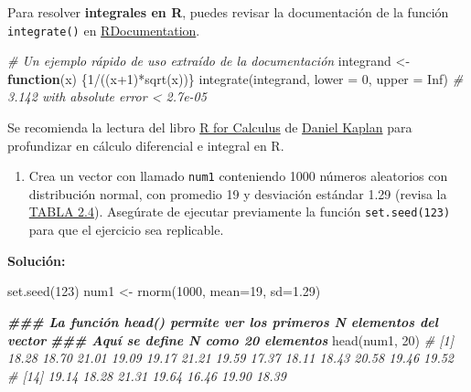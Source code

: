 \documentclass[
]{article}
\newenvironment{Shaded}{\begin{snugshade}}{\end{snugshade}}
\newcommand{\AttributeTok}[1]{\textcolor[rgb]{0.77,0.63,0.00}{#1}}
\newcommand{\CommentTok}[1]{\textcolor[rgb]{0.56,0.35,0.01}{\textit{#1}}}
\newcommand{\ConstantTok}[1]{\textcolor[rgb]{0.00,0.00,0.00}{#1}}
\newcommand{\ControlFlowTok}[1]{\textcolor[rgb]{0.13,0.29,0.53}{\textbf{#1}}}
\newcommand{\DecValTok}[1]{\textcolor[rgb]{0.00,0.00,0.81}{#1}}
\newcommand{\DocumentationTok}[1]{\textcolor[rgb]{0.56,0.35,0.01}{\textbf{\textit{#1}}}}
\newcommand{\FloatTok}[1]{\textcolor[rgb]{0.00,0.00,0.81}{#1}}
\newcommand{\FunctionTok}[1]{\textcolor[rgb]{0.00,0.00,0.00}{#1}}
\newcommand{\NormalTok}[1]{#1}
\newcommand{\OtherTok}[1]{\textcolor[rgb]{0.56,0.35,0.01}{#1}}
\newcommand{\SpecialCharTok}[1]{\textcolor[rgb]{0.00,0.00,0.00}{#1}}
\providecommand{\tightlist}{%
  \setlength{\itemsep}{0pt}\setlength{\parskip}{0pt}}
\theoremstyle{definition}
\theoremstyle{definition}
\theoremstyle{definition}
\theoremstyle{definition}
\theoremstyle{remark}
\begin{document}
Para resolver \textbf{integrales en R}, puedes revisar la documentación de la función \texttt{integrate()} en \href{https://www.rdocumentation.org/packages/stats/versions/3.6.2/topics/integrate}{RDocumentation}.

\begin{Shaded}
\begin{Highlighting}[]
\CommentTok{\# Un ejemplo rápido de uso extraído de la documentación}
\NormalTok{integrand }\OtherTok{\textless{}{-}} \ControlFlowTok{function}\NormalTok{(x) \{}\DecValTok{1}\SpecialCharTok{/}\NormalTok{((x}\SpecialCharTok{+}\DecValTok{1}\NormalTok{)}\SpecialCharTok{*}\FunctionTok{sqrt}\NormalTok{(x))\}}
\FunctionTok{integrate}\NormalTok{(integrand, }\AttributeTok{lower =} \DecValTok{0}\NormalTok{, }\AttributeTok{upper =} \ConstantTok{Inf}\NormalTok{)}
\CommentTok{\# 3.142 with absolute error \textless{} 2.7e{-}05}
\end{Highlighting}
\end{Shaded}

\begin{rmdtip}
Se recomienda la lectura del libro \href{https://dtkaplan.github.io/RforCalculus/integrals-and-integration.html}{R for Calculus} de \href{https://github.com/dtkaplan}{Daniel Kaplan} para profundizar en cálculo diferencial e integral en R.
\end{rmdtip}

\begin{enumerate}
\def\labelenumi{\arabic{enumi}.}
\tightlist
\item
  Crea un vector con llamado \texttt{num1} conteniendo 1000 números aleatorios con distribución normal, con promedio 19 y desviación estándar 1.29 (revisa la \protect\hyperlink{funciones-buxe1sica-uxfatiles}{TABLA 2.4}).
  Asegúrate de ejecutar previamente la función \texttt{set.seed(123)} para que el ejercicio sea replicable.
\end{enumerate}

\textbf{Solución:}

\begin{Shaded}
\begin{Highlighting}[]
\FunctionTok{set.seed}\NormalTok{(}\DecValTok{123}\NormalTok{)}
\NormalTok{num1 }\OtherTok{\textless{}{-}} \FunctionTok{rnorm}\NormalTok{(}\DecValTok{1000}\NormalTok{, }\AttributeTok{mean=}\DecValTok{19}\NormalTok{, }\AttributeTok{sd=}\FloatTok{1.29}\NormalTok{)}

\DocumentationTok{\#\#\# La función head() permite ver los primeros N elementos del vector}
\DocumentationTok{\#\#\# Aquí se define N como 20 elementos}
\FunctionTok{head}\NormalTok{(num1, }\DecValTok{20}\NormalTok{)}
\CommentTok{\#  [1] 18.28 18.70 21.01 19.09 19.17 21.21 19.59 17.37 18.11 18.43 20.58 19.46 19.52}
\CommentTok{\# [14] 19.14 18.28 21.31 19.64 16.46 19.90 18.39}
\end{Highlighting}
\end{Shaded}
\end{document}
